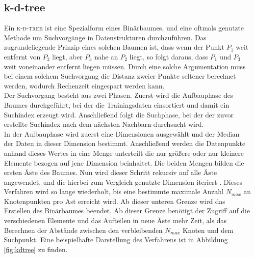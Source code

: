 \subsection{k-d-tree}
Ein \textsc{k-d-tree} ist eine Spezialform eines Binärbaumes, und eine oftmals genutzte Methode um Suchvorgänge in Datenstrukturen durchzuführen. Das zugrundeliegende Prinzip eines solchen Baumen ist, dass wenn der Punkt $P_1$ weit entfernt von $P_2$ liegt, aber $P_3$ nahe an $P_2$ liegt, so folgt daraus, dass $P_1$ und $P_3$ weit voneinander entfernt liegen müssen. Durch eine solche Argumentation muss bei einem solchem Suchvorgang die Distanz zweier Punkte seltener berechnet werden, wodurch Rechenzeit eingespart werden kann.\\
 
Der Suchvorgang besteht aus zwei Phasen. Zuerst wird die Aufbauphase des Baumes durchgeführt, bei der die Trainingsdaten einsortiert und damit ein Suchindex erzeugt wird. Anschließend folgt die Suchphase, bei der der zuvor erstellte Suchindex nach dem nächsten Nachbarn durchsucht wird.\\

In der Aufbauphase wird zuerst eine Dimensionen ausgewählt und der Median der Daten in dieser Dimension bestimmt. Anschließend werden die Datenpunkte anhand dieses Wertes in eine Menge unterteilt die nur größere oder nur kleinere Elemente bezogen auf jene Dimension beinhaltet. Die beiden Mengen bilden die ersten Äste des Baumes. Nun wird dieser Schritt rekursiv auf alle Äste angewendet, und die hierbei zum Vergleich genutzte Dimension iteriert \cite{de2000computational}. Dieses Verfahren wird so lange wiederholt, bis eine bestimmte maximale Anzahl $N_{max}$ an Knotenpunkten pro Ast erreicht wird. Ab dieser unteren Grenze wird das Erstellen des Binärbaumes beendet. Ab dieser Grenze benötigt der Zugriff auf die verschiedenen Elemente und das Aufteilen in neue Äste mehr Zeit, als das Berechnen der Abstände zwischen den verbleibenden $N_{max}$ Knoten und dem Suchpunkt. Eine beispielhafte Darstellung des Verfahrens ist in Abbildung \ref{fig:kdtree} zu finden.

